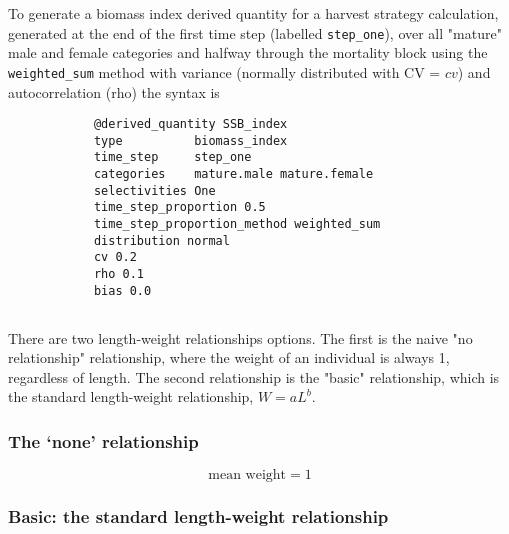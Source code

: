 To generate a biomass index derived quantity for a harvest strategy calculation, generated at the end of the first time step (labelled \texttt{step\_one}), over all "mature" male and female categories and halfway through the mortality block using the \texttt{weighted\_sum} method with variance (normally distributed with CV = $cv$) and autocorrelation (rho) the syntax is

{\small{\begin{verbatim}
			@derived_quantity SSB_index
			type          biomass_index
			time_step     step_one
			categories    mature.male mature.female
			selectivities One
			time_step_proportion 0.5
			time_step_proportion_method weighted_sum
			distribution normal
			cv 0.2
			rho 0.1
			bias 0.0
\end{verbatim}}}

\subsection{\label{sec:Growth}}

\ifAgeBased

\else

\fi %

\subsection{}\label{sec:MeanWeight}\label{sec:LengthWeight}

There are two length-weight relationships options. The first is the naive "no relationship" relationship, where the weight of an individual is always 1, regardless of length. The second relationship is the "basic" relationship, which is the standard length-weight relationship, $W = aL^b$.

\subsubsection{The `none' relationship}\label{sec:LengthWeight-None}

\begin{equation}
  \text{mean weight}=1
\end{equation}

\subsubsection{Basic: the standard length-weight relationship}\label{sec:LengthWeight-Basic}

